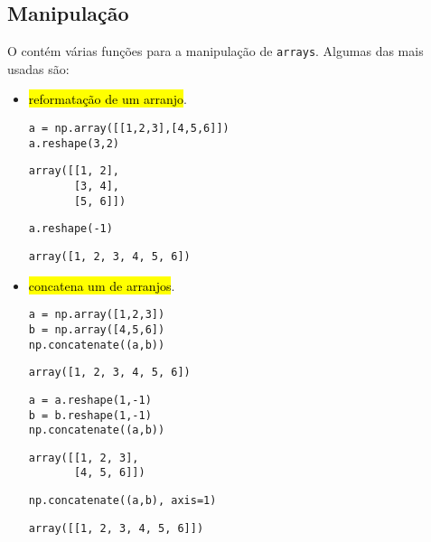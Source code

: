 \subsection{Manipulação}

O {\numpy} contém várias funções para a manipulação de \texttt{arrays}. Algumas das mais usadas são:
\begin{itemize}
\item {\PYTHONnumpyDOTreshape} \hl{reformatação de um arranjo}.

\begin{lstlisting}[xrightmargin=2.5em]
a = np.array([[1,2,3],[4,5,6]])
a.reshape(3,2)
\end{lstlisting}

\begin{verbatim}
array([[1, 2],
       [3, 4],
       [5, 6]])
\end{verbatim}

\begin{lstlisting}
a.reshape(-1)
\end{lstlisting}

\begin{verbatim}
array([1, 2, 3, 4, 5, 6])
\end{verbatim}

\item {\PYTHONnumpyDOTconcatenate} \hl{concatena um {\PYTHONtuple} de arranjos}.

\begin{lstlisting}[xrightmargin=2.5em]
a = np.array([1,2,3])
b = np.array([4,5,6])
np.concatenate((a,b))
\end{lstlisting}

\begin{verbatim}
array([1, 2, 3, 4, 5, 6])
\end{verbatim}

\begin{lstlisting}
a = a.reshape(1,-1)
b = b.reshape(1,-1)
np.concatenate((a,b))
\end{lstlisting}

\begin{verbatim}
array([[1, 2, 3],
       [4, 5, 6]])
\end{verbatim}

\begin{lstlisting}
np.concatenate((a,b), axis=1)
\end{lstlisting}

\begin{verbatim}
array([[1, 2, 3, 4, 5, 6]])
\end{verbatim}

\end{itemize}

